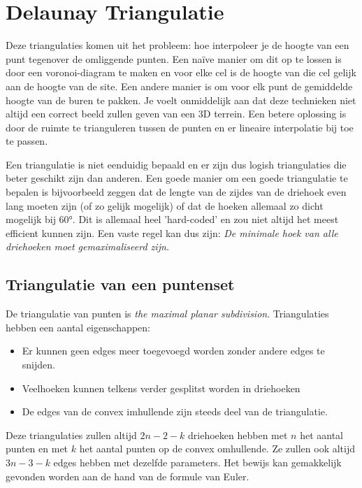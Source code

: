 \documentclass[12pt,a4paper]{article}
\begin{document}
	
	\section{Delaunay Triangulatie}
	Deze triangulaties komen uit het probleem: hoe interpoleer je de hoogte van een punt tegenover de omliggende punten. Een naïve manier om dit op te lossen is door een voronoi-diagram te maken en voor elke cel is de hoogte van die cel gelijk aan de hoogte van de site. Een andere manier is om voor elk punt de gemiddelde hoogte van de buren te pakken. Je voelt onmiddelijk aan dat deze technieken niet altijd een correct beeld zullen geven van een 3D terrein. Een betere oplossing is door de ruimte te trianguleren tussen de punten en er lineaire interpolatie bij toe te passen. 
	
	Een triangulatie is niet eenduidig bepaald en er zijn dus logish triangulaties die beter geschikt zijn dan anderen. Een goede manier om een goede triangulatie te bepalen is bijvoorbeeld zeggen dat de lengte van de zijdes van de driehoek even lang moeten zijn (of zo gelijk mogelijk) of dat de hoeken allemaal zo dicht mogelijk bij 60°. Dit is allemaal heel 'hard-coded' en zou niet altijd het meest efficient kunnen zijn. Een vaste regel kan dus zijn: \textit{De minimale hoek van alle driehoeken moet gemaximaliseerd zijn.}
	
	
	\subsection{Triangulatie van een puntenset}
	De triangulatie van punten is \textit{the maximal planar subdivision}. Triangulaties hebben een aantal eigenschappen: 
	\begin{itemize}
		\item Er kunnen geen edges meer toegevoegd worden zonder andere edges te snijden. 
		\item Veelhoeken kunnen telkens verder gesplitst worden in driehoeken
		\item De edges van de convex imhullende zijn steeds deel van de triangulatie.
	\end{itemize}

	Deze triangulaties zullen altijd $2n - 2 - k$ driehoeken hebben met $n$ het aantal punten en met $k$ het aantal punten op de convex omhullende. Ze zullen ook altijd $3n - 3 - k$ edges hebben met dezelfde parameters. Het bewijs kan gemakkelijk gevonden worden aan de hand van de formule van Euler. 
	
\end{document}
